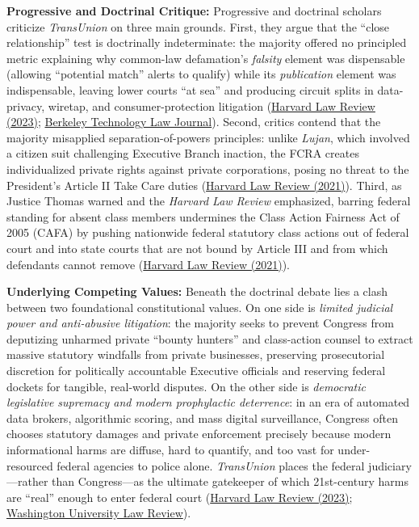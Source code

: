 \documentclass[12pt]{article}
\begin{document}
\textbf{Progressive and Doctrinal Critique:} Progressive and doctrinal scholars criticize \textit{TransUnion} on three main grounds. First, they argue that the ``close relationship'' test is doctrinally indeterminate: the majority offered no principled metric explaining why common-law defamation's \textit{falsity} element was dispensable (allowing ``potential match'' alerts to qualify) while its \textit{publication} element was indispensable, leaving lower courts ``at sea'' and producing circuit splits in data-privacy, wiretap, and consumer-protection litigation (\href{https://harvardlawreview.org/print/vol-136/standing-in-the-way-the-courts-escalating-interference-in-federal-policymaking/}{Harvard Law Review (2023)}; \href{https://btlj.org/wp-content/uploads/2026/08/Hua_Ready-ADA-Compliant_08-11-26.pdf}{Berkeley Technology Law Journal}). Second, critics contend that the majority misapplied separation-of-powers principles: unlike \textit{Lujan}, which involved a citizen suit challenging Executive Branch inaction, the FCRA creates individualized private rights against private corporations, posing no threat to the President's Article II Take Care duties (\href{https://harvardlawreview.org/print/vol-135/transunion-v-ramirez/}{Harvard Law Review (2021)}). Third, as Justice Thomas warned and the \textit{Harvard Law Review} emphasized, barring federal standing for absent class members undermines the Class Action Fairness Act of 2005 (CAFA) by pushing nationwide federal statutory class actions out of federal court and into state courts that are not bound by Article III and from which defendants cannot remove (\href{https://harvardlawreview.org/print/vol-135/transunion-v-ramirez/}{Harvard Law Review (2021)}).

\textbf{Underlying Competing Values:} Beneath the doctrinal debate lies a clash between two foundational constitutional values. On one side is \textit{limited judicial power and anti-abusive litigation}: the majority seeks to prevent Congress from deputizing unharmed private ``bounty hunters'' and class-action counsel to extract massive statutory windfalls from private businesses, preserving prosecutorial discretion for politically accountable Executive officials and reserving federal dockets for tangible, real-world disputes. On the other side is \textit{democratic legislative supremacy and modern prophylactic deterrence}: in an era of automated data brokers, algorithmic scoring, and mass digital surveillance, Congress often chooses statutory damages and private enforcement precisely because modern informational harms are diffuse, hard to quantify, and too vast for under-resourced federal agencies to police alone. \textit{TransUnion} places the federal judiciary---rather than Congress---as the ultimate gatekeeper of which 21st-century harms are ``real'' enough to enter federal court (\href{https://harvardlawreview.org/print/vol-136/standing-in-the-way-the-courts-escalating-interference-in-federal-policymaking/}{Harvard Law Review (2023)}; \href{https://washulawreview.org/the-evolution-of-standing-and-the-need-for-foundational-realism-a-historical-inquiry-from-hayburn-to-harvard/}{Washington University Law Review}).
\end{document}
